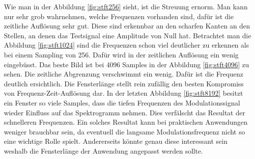 Wie man in der Abbildung \ref{fig:stft256} sieht, ist die Streuung ernorm. Man kann nur sehr grob wahrnehmen, welche Frequenzen vorhanden sind, dafür ist die zeitliche Auflösung sehr gut. Diese sind erkennbar an den scharfen Kanten an den Stellen, an denen das Testsignal eine Amplitude von Null hat. 
Betrachtet man die Abbildung \ref{fig:stft1024} sind die Frequenzen schon viel deutlicher zu erkennen als bei einem Sampling von 256. Dafür wird in der zeitlichen Auflösung ein wenig eingebüsst.
Das beste Bild ist bei 4096 Samples in der Abbildung \ref{fig:stft4096} zu sehen. Die zeitliche Abgrenzung verschwimmt ein wenig. Dafür ist die Frequenz deutlich ersichtlich. Die Fensterlänge stellt rein zufällig den besten Kompromiss von Frequenz-Zeit-Auflösung dar.
In der letzten Abbildung \ref{fig:stft8192} besitzt ein Fenster so viele Samples, dass die tiefen Frequenzen des Modulationssignal wieder Einfluss auf das Spektrogramm nehmen. Dies verfälscht das Resultat der schnelleren Frequenzen. Ein solches Resultat kann bei praktischen Anwendungen weniger brauchbar sein, da eventuell die  langsame Modulationsfrequenz nicht so eine wichtige Rolle spielt. Andererseits könnte genau diese interessant sein weshalb die Fensterlänge der Anwendung angepasst werden sollte.

\newpage





